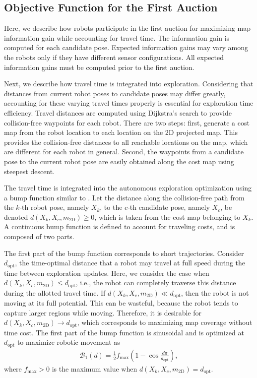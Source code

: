 \subsection{Objective Function for the First Auction}


Here, we describe how robots participate in the first auction for maximizing map information gain while accounting for travel time. The information gain  is computed for each candidate pose. Expected information gains may vary among the robots only if they have different sensor configurations. All expected information gains must be computed prior to the first auction.

Next, we describe how travel time is integrated into exploration. Considering that distances from current robot poses to candidate poses may differ greatly, accounting for these varying travel times properly is essential for exploration time efficiency. Travel distances are computed using Dijkstra's search to provide collision-free waypoints for each robot. There are two steps: first, generate a cost map from the robot location to each location on the 2D projected map. This provides the collision-free distances to all reachable locations on the map, which are different for each robot in general. Second, the waypoints from a candidate pose to the current robot pose are easily obtained along the cost map using steepest descent. 

The travel time is integrated into the autonomous exploration optimization using a bump function similar to . Let the distance along the collision-free path from the $k$-th robot pose, namely $X_k$, to the $c$-th candidate pose, namely $X_c$, be denoted $d(X_k,X_c,m_\text{2D})\geq0$, which is taken from the cost map belonging to $X_k$. A continuous bump function is defined to account for traveling costs, and is composed of two parts.  

The first part of the bump function corresponds to short trajectories. Consider $d_\text{opt}$, the time-optimal distance that a robot may travel at full speed during the time between exploration updates. Here, we consider the case when $d(X_k,X_c,m_\text{2D})\leq d_\text{opt}$, i.e., the robot can completely traverse this distance during the allotted travel time. If $d(X_k,X_c,m_\text{2D})\ll d_\text{opt}$, then the robot is not moving at its full potential. This can be wasteful, because the robot tends to capture larger regions while moving. Therefore, it is desirable for $d(X_k,X_c,m_\text{2D})\rightarrow d_\text{opt}$, which corresponds to maximizing map coverage without time cost. The first part of the bump function is sinusoidal and is optimized at $d_\text{opt}$ to maximize robotic movement as
\begin{align}
\label{eqn:BumpFunIncreasing}
\mathcal B_1(d)=\frac12 f_\text{max}\left(1-\cos{\frac{d\pi}{d_\text{opt}}}\right),
\end{align}
where $f_\text{max}>0$ is the maximum value when $d(X_k,X_c,m_\text{2D})=d_\text{opt}$.

